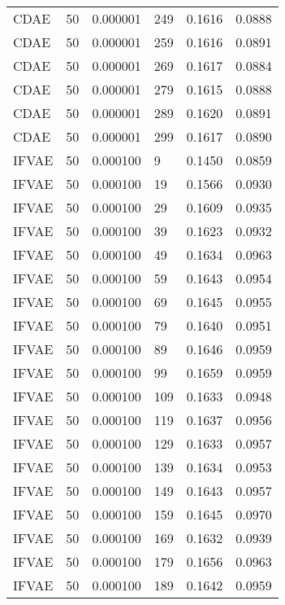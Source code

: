 \begin{tabular}{llrlrr}
    CDAE &   50 &  0.000001 &   249 &  0.1616 &       0.0888 \\
    CDAE &   50 &  0.000001 &   259 &  0.1616 &       0.0891 \\
    CDAE &   50 &  0.000001 &   269 &  0.1617 &       0.0884 \\
    CDAE &   50 &  0.000001 &   279 &  0.1615 &       0.0888 \\
    CDAE &   50 &  0.000001 &   289 &  0.1620 &       0.0891 \\
    CDAE &   50 &  0.000001 &   299 &  0.1617 &       0.0890 \\
   IFVAE &   50 &  0.000100 &     9 &  0.1450 &       0.0859 \\
   IFVAE &   50 &  0.000100 &    19 &  0.1566 &       0.0930 \\
   IFVAE &   50 &  0.000100 &    29 &  0.1609 &       0.0935 \\
   IFVAE &   50 &  0.000100 &    39 &  0.1623 &       0.0932 \\
   IFVAE &   50 &  0.000100 &    49 &  0.1634 &       0.0963 \\
   IFVAE &   50 &  0.000100 &    59 &  0.1643 &       0.0954 \\
   IFVAE &   50 &  0.000100 &    69 &  0.1645 &       0.0955 \\
   IFVAE &   50 &  0.000100 &    79 &  0.1640 &       0.0951 \\
   IFVAE &   50 &  0.000100 &    89 &  0.1646 &       0.0959 \\
   IFVAE &   50 &  0.000100 &    99 &  0.1659 &       0.0959 \\
   IFVAE &   50 &  0.000100 &   109 &  0.1633 &       0.0948 \\
   IFVAE &   50 &  0.000100 &   119 &  0.1637 &       0.0956 \\
   IFVAE &   50 &  0.000100 &   129 &  0.1633 &       0.0957 \\
   IFVAE &   50 &  0.000100 &   139 &  0.1634 &       0.0953 \\
   IFVAE &   50 &  0.000100 &   149 &  0.1643 &       0.0957 \\
   IFVAE &   50 &  0.000100 &   159 &  0.1645 &       0.0970 \\
   IFVAE &   50 &  0.000100 &   169 &  0.1632 &       0.0939 \\
   IFVAE &   50 &  0.000100 &   179 &  0.1656 &       0.0963 \\
   IFVAE &   50 &  0.000100 &   189 &  0.1642 &       0.0959 \\

\end{tabular}
